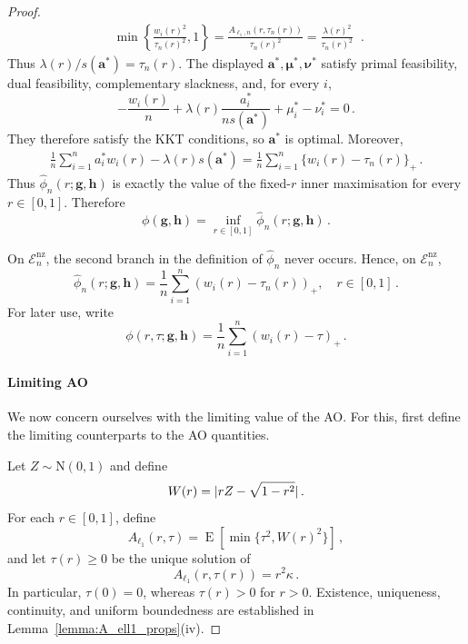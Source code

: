 \documentclass{article}
\makeatletter
\DeclareMathOperator{\expect}{E}
\theoremstyle{definition}
\newcommand{\abs}[1]{%
	\ensuremath{%
		\if@display
		\left| #1 \right|
		\else
		\lvert #1 \rvert
		\fi
	}%
}
\newcommand*{\bb}{\boldsymbol}
\def\bh{\bb{h}}
\def\bg{\bb{g}}
\makeatother
\begin{document}
\begin{bibunit}
\begin{proof}
$$\begin{aligned}
		\min\left\{\frac{w_i(r)^2}{\tau_n(r)^2},1\right\}
		=
		\frac{A_{\ell_1,n}(r,\tau_n(r))}{\tau_n(r)^2}
		=
		\frac{\lambda(r)^2}{\tau_n(r)^2} 
		\end{aligned}\,.
		$$
		Thus $\lambda(r)/s(\bb a^*)=\tau_n(r)$. The displayed
		$\bb a^*,\bb\mu^*,\bb\nu^*$ satisfy primal feasibility, dual
		feasibility, complementary slackness, and, for every $i$,
		$$
		-\frac{w_i(r)}n
		+
		\lambda(r)\frac{a_i^*}{n s(\bb a^*)}
		+
		\mu_i^*
		-
		\nu_i^*
		=0  \,.
		$$
		They therefore satisfy the KKT conditions, so $\bb a^*$ is optimal.
		Moreover,
		$$
		\begin{aligned}
		\frac1n\sum_{i=1}^na_i^*w_i(r)-\lambda(r)s(\bb a^*) =
		\frac1n\sum_{i=1}^n\{w_i(r)-\tau_n(r)\}_+ \,.
		\end{aligned}
		$$
		Thus $\widehat\phi_n(r;\bg,\bh)$ is exactly the value of the
		fixed-$r$ inner maximisation for every $r\in[0,1]$.
		Therefore
		\begin{equation}
		    \label{eq:ao-r}
		    \phi(\bg,\bh)
		    =
		    \underset{r\in[0,1]}{\inf}
		    \widehat\phi_n(r;\bg,\bh) \,.
		\end{equation}
		
		On $\mathcal E_n^{\mathrm{nz}}$, the second branch in the definition of
		$\widehat\phi_n$ never occurs. Hence, on $\mathcal E_n^{\mathrm{nz}}$,
		$$
		\widehat\phi_n(r;\bg,\bh)
		=
		\frac{1}{n}\sum_{i=1}^{n}
			\left(w_i(r)-\tau_n(r)\right)_+,
		\quad r\in[0,1]\,.
		$$
		For later use, write
		$$
		\phi(r,\tau;\bg,\bh)
		=
			\frac{1}{n}\sum_{i=1}^{n}\left(w_i(r)-\tau\right)_+ \,.
		$$




\paragraph*{Limiting AO}

We now concern ourselves with the limiting value of the AO.
For this, first define the limiting counterparts to the AO
quantities.


Let $Z \sim \mathrm{N}(0,1)$ and define
$$
    W(r) = \abs{r Z - \sqrt{1-r^2}} \,.
$$
For each $r \in [0,1]$, define
$$
    A_{\ell_1}(r,\tau) = \expect\left[\min\{\tau^2, W(r)^2\}\right]\,,
$$
and let $\tau(r)\geq0$ be the unique solution of
\begin{equation}
    \label{eq:tau-pop-eq}
    A_{\ell_1}(r,\tau(r)) =r^2 \kappa\,.
\end{equation}
In particular, $\tau(0)=0$, whereas $\tau(r)>0$ for $r>0$.
Existence, uniqueness, continuity, and uniform boundedness are
established in Lemma~\ref{lemma:A_ell1_props}(iv).


\end{proof}
\end{bibunit}
\end{document}
